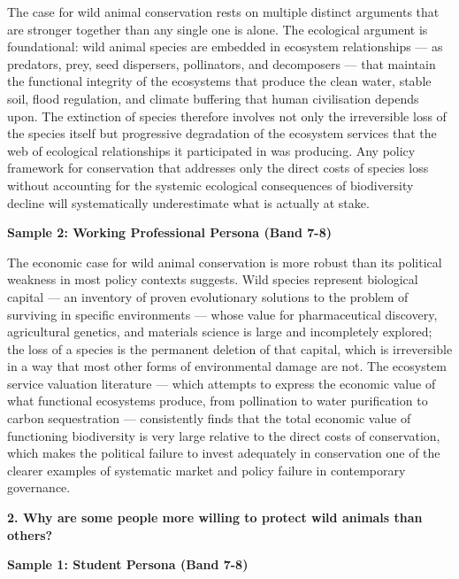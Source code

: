 The case for wild animal conservation rests on multiple distinct arguments that are stronger together than any single one is alone. The ecological argument is foundational: wild animal species are embedded in ecosystem relationships — as predators, prey, seed dispersers, pollinators, and decomposers — that maintain the functional integrity of the ecosystems that produce the clean water, stable soil, flood regulation, and climate buffering that human civilisation depends upon. The extinction of species therefore involves not only the irreversible loss of the species itself but progressive degradation of the ecosystem services that the web of ecological relationships it participated in was producing. Any policy framework for conservation that addresses only the direct costs of species loss without accounting for the systemic ecological consequences of biodiversity decline will systematically underestimate what is actually at stake.

\textbf{Sample 2: Working Professional Persona (Band 7-8)}

The economic case for wild animal conservation is more robust than its political weakness in most policy contexts suggests. Wild species represent biological capital — an inventory of proven evolutionary solutions to the problem of surviving in specific environments — whose value for pharmaceutical discovery, agricultural genetics, and materials science is large and incompletely explored; the loss of a species is the permanent deletion of that capital, which is irreversible in a way that most other forms of environmental damage are not. The ecosystem service valuation literature — which attempts to express the economic value of what functional ecosystems produce, from pollination to water purification to carbon sequestration — consistently finds that the total economic value of functioning biodiversity is very large relative to the direct costs of conservation, which makes the political failure to invest adequately in conservation one of the clearer examples of systematic market and policy failure in contemporary governance.

\separator

\begin{ieltsquestion}
\textbf{2. Why are some people more willing to protect wild animals than others?}
\end{ieltsquestion}
\textbf{Sample 1: Student Persona (Band 7-8)}

